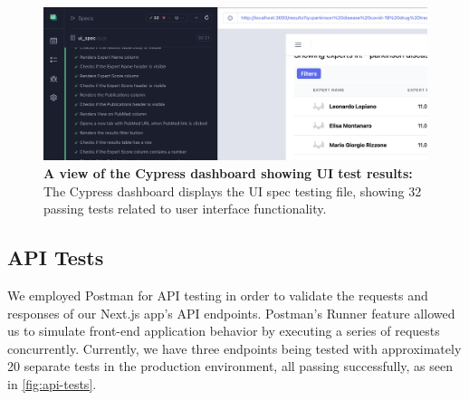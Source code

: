 \begin{figure}[htp]
    \centering
    \includegraphics[width=\textwidth]{Images/ui-tests.png}
    \caption[UI Test Results in Cypress Dashboard]{\textbf{A view of the Cypress dashboard showing UI test results:} The Cypress dashboard displays the UI spec testing file, showing 32 passing tests related to user interface functionality. }
    \label{fig:ui-tests}
\end{figure}

\subsection{API Tests}

We employed Postman for API testing in order to validate the requests and responses of our Next.js app's API endpoints. Postman's Runner feature allowed us to simulate front-end application behavior by executing a series of requests concurrently. Currently, we have three endpoints being tested with approximately 20 separate tests in the production environment, all passing successfully, as seen in \autoref{fig:api-tests}.

